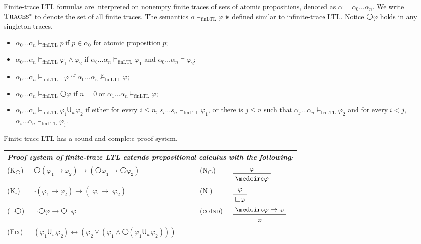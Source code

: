 \documentclass[letter,12pt]{article}
\newcommand{\imp}{\to}
\newcommand{\dimp}{\leftrightarrow}
\newcommand{\finLTL}{\mathrm{finLTL}}
\newcommand{\prule}[1]{\textsc{(#1)}}
\newcommand{\wnext}{{\medcirc}}
\newcommand{\always}{{\square}}
\newcommand{\Uw}{\mathbin{\mathsf{U}_w}}
\newcommand{\finTraces}{\textsc{Traces$^*$}\xspace}
\begin{document}
Finite-trace LTL formulas are interpreted on nonempty finite traces
of sets of atomic propositions, denoted as
$\alpha = \alpha_0 \dots \alpha_n$.
We write $\finTraces$ to denote the set of all finite traces.
The semantics $\alpha \vDash_\finLTL \varphi$ is defined
similar to infinite-trace LTL.
Notice $\wnext \varphi$ holds in any singleton traces.
\begin{itemize}
	\item $\alpha_0 \dots \alpha_n 
	\vDash_\finLTL p$ if $p \in \alpha_0$ for atomic proposition $p$;
	\item $\alpha_0 \dots \alpha_n  \vDash_\finLTL \varphi_1 \wedge \varphi_2$
	if $\alpha_0 \dots \alpha_n  \vDash_\finLTL \varphi_1$ and 
	$\alpha_0 \dots \alpha_n  \vDash \varphi_2$;
	\item $\alpha_0 \dots \alpha_n  \vDash_\finLTL \neg \varphi$
	if $\alpha_0 \dots \alpha_n  \not\vDash_\finLTL \varphi$;
	\item $\alpha_0 \dots \alpha_n \vDash_\finLTL \wnext \varphi$
	if $n = 0$ or $\alpha_1 \dots \alpha_n \vDash_\finLTL \varphi$;
	\item $\alpha_0 \dots \alpha_n \vDash_\finLTL \varphi_1 \Uw \varphi_2$
	if either for every $i \le n$,
	$s_i \dots s_n \vDash_\finLTL \varphi_1$,
	or there is $j \le n$ such that
	$\alpha_j \dots \alpha_n \vDash_\finLTL \varphi_2$ and for every $i < j$,
	$\alpha_i \dots \alpha_n \vDash_\finLTL \varphi_1$.
\end{itemize}
Finite-trace LTL has a sound and complete proof system.
\begin{center}
\begin{tabular}{lm{6cm}lm{3cm}}
\multicolumn{4}{l}{
\em
Proof system of finite-trace LTL extends propositional calculus with the following:
}
\\\hline
\prule{K$_\wnext$}
&
$\wnext (\varphi_1 \imp \varphi_2) \imp (\wnext \varphi_1 \imp \wnext 
\varphi_2)$
&
\prule{N$_\wnext$}
&
$\prftree{\varphi}{\wnext \varphi}$
\\
\prule{K$_\always$}
&
$\always (\varphi_1 \imp \varphi_2) \imp (\always \varphi_1 \imp \always 
\varphi_2)$
&
\prule{N$_\always$}
&
$\prftree{\varphi}{\always \varphi}$
\\
\prule{$\neg \wnext$}
&
$\neg \wnext \varphi \imp \wnext \neg \varphi$
&
\prule{coInd}
&
$\prftree{\wnext \varphi \imp \varphi}{\varphi}
$
\\
\prule{Fix}
&
$(\varphi_1 \Uw \varphi_2) 
\dimp 
(\varphi_2 \vee (\varphi_1 \wedge \wnext (\varphi_1 \Uw \varphi_2)))$
\end{tabular}
\end{center}
\end{document}
